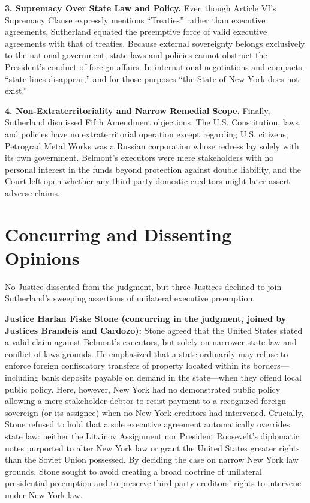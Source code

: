 \documentclass[12pt]{article}
\begin{document}
\textbf{3. Supremacy Over State Law and Policy.} Even though Article VI's Supremacy Clause expressly mentions ``Treaties'' rather than executive agreements, Sutherland equated the preemptive force of valid executive agreements with that of treaties. Because external sovereignty belongs exclusively to the national government, state laws and policies cannot obstruct the President's conduct of foreign affairs. In international negotiations and compacts, ``state lines disappear,'' and for those purposes ``the State of New York does not exist.''

\textbf{4. Non-Extraterritoriality and Narrow Remedial Scope.} Finally, Sutherland dismissed Fifth Amendment objections. The U.S. Constitution, laws, and policies have no extraterritorial operation except regarding U.S. citizens; Petrograd Metal Works was a Russian corporation whose redress lay solely with its own government. Belmont's executors were mere stakeholders with no personal interest in the funds beyond protection against double liability, and the Court left open whether any third-party domestic creditors might later assert adverse claims.

\section{Concurring and Dissenting Opinions}

No Justice dissented from the judgment, but three Justices declined to join Sutherland's sweeping assertions of unilateral executive preemption.

\textbf{Justice Harlan Fiske Stone (concurring in the judgment, joined by Justices Brandeis and Cardozo):} Stone agreed that the United States stated a valid claim against Belmont's executors, but solely on narrower state-law and conflict-of-laws grounds. He emphasized that a state ordinarily may refuse to enforce foreign confiscatory transfers of property located within its borders---including bank deposits payable on demand in the state---when they offend local public policy. Here, however, New York had no demonstrated public policy allowing a mere stakeholder-debtor to resist payment to a recognized foreign sovereign (or its assignee) when no New York creditors had intervened. Crucially, Stone refused to hold that a sole executive agreement automatically overrides state law: neither the Litvinov Assignment nor President Roosevelt's diplomatic notes purported to alter New York law or grant the United States greater rights than the Soviet Union possessed. By deciding the case on narrow New York law grounds, Stone sought to avoid creating a broad doctrine of unilateral presidential preemption and to preserve third-party creditors' rights to intervene under New York law.
\end{document}
